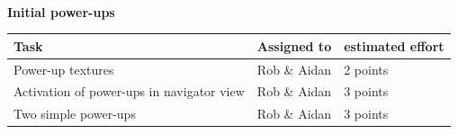 \documentclass{article}
\begin{document}
\newline \\
\textbf{Initial power-ups} \\
\begin{tabular}{ | l | l | l | }
\hline
\textbf{Task} & \textbf{Assigned to} & \textbf{estimated effort} \\ \hline
Power-up textures &  Rob \& Aidan   & 2 points \\ \hline
Activation of power-ups in navigator view & Rob \& Aidan   & 3 points \\ \hline
Two simple power-ups  &  Rob \& Aidan  & 3 points \\ \hline
\end{tabular} \newline
\newline \\
\end{document}
